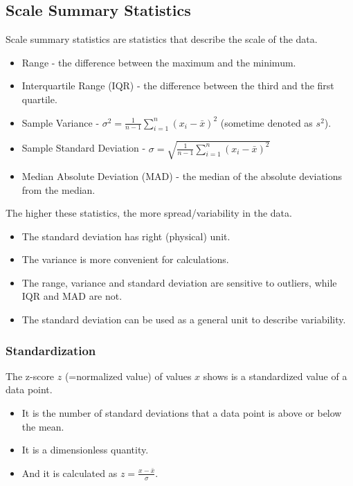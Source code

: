 \subsection{Scale Summary Statistics}
\begin{definition}
    Scale summary statistics are statistics that describe the scale of the data.
    \begin{itemize}
        \item Range - the difference between the maximum and the minimum.
        \item Interquartile Range (IQR) - the difference between the third and the first quartile.
        \item Sample Variance - $\sigma^2 = \displaystyle\frac{1}{n-1}\sum_{i=1}^{n}(x_i - \bar{x})^2$ (sometime denoted as $s^2$).
        \item Sample Standard Deviation - $\sigma = \sqrt{\displaystyle\frac{1}{n-1}\sum_{i=1}^{n}(x_i-\bar{x})^2}$
        \item Median Absolute Deviation (MAD) - the median of the absolute deviations from the median.
    \end{itemize}
    
    The higher these statistics, the more spread/variability in the data.
\end{definition}

\begin{remark}
    \begin{itemize}
        \item The standard deviation has right (physical) unit.
        \item The variance is more convenient for calculations.
        \item The range, variance and standard deviation are sensitive to outliers, while IQR and MAD are not. 
        \item The standard deviation can be used as a general unit to describe variability.
    \end{itemize}
\end{remark}

\subsubsection*{Standardization}
\begin{definition}[z-score]
    The z-score $z$ (=normalized value) of values $x$ shows is a standardized value of a data point.
    \begin{itemize}
        \item It is the number of standard deviations that a data point is above or below the mean.
        \item It is a dimensionless quantity.
        \item And it is calculated as $z = \displaystyle\frac{x-\bar{x}}{\sigma}$.
    \end{itemize}
\end{definition}

